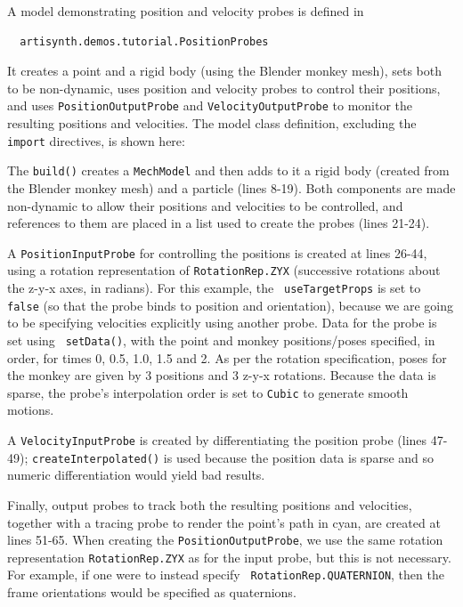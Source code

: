 A model demonstrating position and velocity probes is defined in
%
\begin{verbatim}
  artisynth.demos.tutorial.PositionProbes
\end{verbatim}
%
It creates a point and a rigid body (using the Blender monkey mesh), sets both
to be non-dynamic, uses position and velocity probes to control their
positions, and uses {\tt PositionOutputProbe} and {\tt VelocityOutputProbe} to
monitor the resulting positions and velocities. The model class definition,
excluding the {\tt import} directives, is shown here:
%
\lstset{numbers=left}
\iflatexml

\else

\fi
\lstset{numbers=none}
%
The {\tt build()} creates a {\tt MechModel} and then adds to it a rigid body
(created from the Blender monkey mesh) and a particle (lines 8-19).  Both
components are made non-dynamic to allow their positions and velocities to be
controlled, and references to them are placed in a list used to create the probes
(lines 21-24).

A {\tt PositionInputProbe} for controlling the positions is created at lines
26-44, using a rotation representation of {\tt RotationRep.ZYX} (successive
rotations about the z-y-x axes, in radians). For this example, the {\tt
useTargetProps} is set to {\tt false} (so that the probe binds to {\sf
position} and {\sf orientation}), because we are going to be specifying
velocities explicitly using another probe. Data for the probe is set using {\tt
setData()}, with the point and monkey positions/poses specified, in order, for
times 0, 0.5, 1.0, 1.5 and 2. As per the rotation specification, poses for the
monkey are given by 3 positions and 3 z-y-x rotations. Because the data is
sparse, the probe's interpolation order is set to {\tt Cubic} to generate
smooth motions.

A {\tt VelocityInputProbe} is created by differentiating the position probe
(lines 47-49); {\tt createInterpolated()} is used because the position data is
sparse and so numeric differentiation would yield bad results.

Finally, output probes to track both the resulting positions and velocities,
together with a tracing probe to render the point's path in cyan, are created
at lines 51-65. When creating the {\tt PositionOutputProbe}, we use the same
rotation representation {\tt RotationRep.ZYX} as for the input probe, but this
is not necessary. For example, if one were to instead specify {\tt
RotationRep.QUATERNION}, then the frame orientations would be specified as
quaternions.

